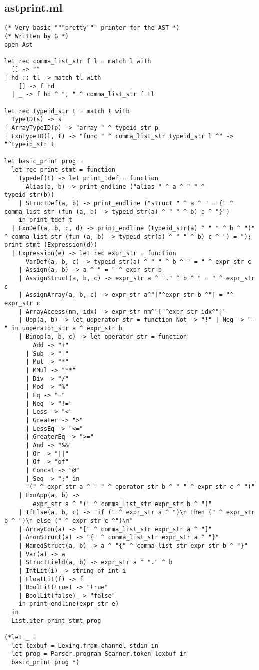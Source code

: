 \documentclass[main.tex]{subfiles}
\begin{document}
\subsection{astprint.ml}
\begin{lstlisting}
(* Very basic """pretty""" printer for the AST *)
(* Written by G *)
open Ast

let rec comma_list_str f l = match l with
  [] -> ""
| hd :: tl -> match tl with
    [] -> f hd
  | _ -> f hd ^ ", " ^ comma_list_str f tl

let rec typeid_str t = match t with
  TypeID(s) -> s
| ArrayTypeID(p) -> "array " ^ typeid_str p
| FxnTypeID(l, t) -> "func " ^ comma_list_str typeid_str l ^" -> "^typeid_str t

let basic_print prog = 
  let rec print_stmt = function
    Typedef(t) -> let print_tdef = function
      Alias(a, b) -> print_endline ("alias " ^ a ^ " " ^ typeid_str(b))
    | StructDef(a, b) -> print_endline ("struct " ^ a ^ " = {" ^ comma_list_str (fun (a, b) -> typeid_str(a) ^ " " ^ b) b ^ "}")
    in print_tdef t
  | FxnDef(a, b, c, d) -> print_endline (typeid_str(a) ^ " " ^ b ^ "(" ^ comma_list_str (fun (a, b) -> typeid_str(a) ^ " " ^ b) c ^ ") = "); print_stmt (Expression(d))
  | Expression(e) -> let rec expr_str = function
      VarDef(a, b, c) -> typeid_str(a) ^ " " ^ b ^ " = " ^ expr_str c
    | Assign(a, b) -> a ^ " = " ^ expr_str b
    | AssignStruct(a, b, c) -> expr_str a ^ "." ^ b ^ " = " ^ expr_str c
    | AssignArray(a, b, c) -> expr_str a^"["^expr_str b ^"] = "^ expr_str c
    | ArrayAccess(nm, idx) -> expr_str nm^"["^expr_str idx^"]"
    | Uop(a, b) -> let uoperator_str = function Not -> "!" | Neg -> "-" in uoperator_str a ^ expr_str b
    | Binop(a, b, c) -> let operator_str = function
        Add -> "+"
      | Sub -> "-"
      | Mul -> "*"
      | MMul -> "**"
      | Div -> "/"
      | Mod -> "%"
      | Eq -> "="
      | Neq -> "!="
      | Less -> "<"
      | Greater -> ">"
      | LessEq -> "<="
      | GreaterEq -> ">="
      | And -> "&&"
      | Or -> "||"
      | Of -> "of"
      | Concat -> "@"
      | Seq -> ";" in
      "(" ^ expr_str a ^ " " ^ operator_str b ^ " " ^ expr_str c ^ ")"
    | FxnApp(a, b) -> 
        expr_str a ^ "(" ^ comma_list_str expr_str b ^ ")"
    | IfElse(a, b, c) -> "if (" ^ expr_str a ^ ")\n then (" ^ expr_str b ^ ")\n else (" ^ expr_str c ^")\n"
    | ArrayCon(a) -> "[" ^ comma_list_str expr_str a ^ "]"
    | AnonStruct(a) -> "{" ^ comma_list_str expr_str a ^ "}"
    | NamedStruct(a, b) -> a ^ "{" ^ comma_list_str expr_str b ^ "}"
    | Var(a) -> a
    | StructField(a, b) -> expr_str a ^ "." ^ b
    | IntLit(i) -> string_of_int i
    | FloatLit(f) -> f
    | BoolLit(true) -> "true"
    | BoolLit(false) -> "false"
    in print_endline(expr_str e)
  in
  List.iter print_stmt prog

(*let _ =
  let lexbuf = Lexing.from_channel stdin in
  let prog = Parser.program Scanner.token lexbuf in
  basic_print prog *)
\end{lstlisting}
\end{document}
